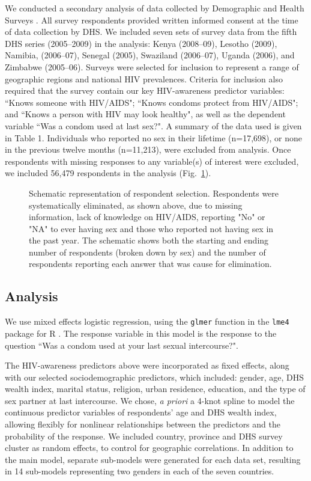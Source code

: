 \documentclass[10pt,letterpaper]{article}
\newcommand{\fref}[1]{Fig.~\ref{#1.fig}}
\newcommand{\KnowsPWHA}{``Knows someone with HIV/AIDS"}
\newcommand{\KnowsCP}{``Knows condoms protect from HIV/AIDS"}
\newcommand{\KnowsHealthy}{``Knows a person with HIV may look healthy"}
\begin{document}
We conducted a secondary analysis of data collected by Demographic and Health Surveys \cite{DHS}. All survey respondents provided written informed consent at the time of data collection by DHS.
We included seven sets of survey data from the fifth DHS series (2005--2009) in the analysis: Kenya (2008--09), Lesotho (2009), Namibia, (2006--07), Senegal (2005), Swaziland (2006--07), Uganda (2006), and Zimbabwe (2005--06). Surveys were selected for inclusion to represent a range of geographic regions and national HIV prevalences.  Criteria for inclusion also required that the survey contain  our key HIV-awareness predictor variables: \KnowsPWHA; \KnowsCP; and \KnowsHealthy, as well as the dependent variable ``Was a condom used at last sex?".  A summary of the data used is given in Table 1. Individuals who reported no sex in their lifetime (n=17,698), or none in the previous twelve months (n=11,213), were excluded from analysis. Once respondents with missing responses to any variable(s) of interest were excluded, we included 56,479 respondents in the analysis (\fref{flowchart}).


\begin{figure}[!hbt]
\caption{Schematic representation of respondent selection. Respondents were systematically eliminated, as shown above, due to missing information, lack of knowledge on HIV/AIDS,  reporting "No" or "NA" to ever having sex and those who reported not having sex in the past year. The schematic shows both the starting and ending number of respondents (broken down by sex) and the number of respondents reporting each answer that was cause for elimination.}
\label{flowchart.fig}
\end{figure}

\subsection{Analysis}

We use mixed effects logistic regression, using the {\tt glmer} function in the {\tt lme4} package for R \cite{Rstats,Rpackage_lme4}. The response variable in this model is the response to the question ``Was a condom used at your last sexual intercourse?". 

The HIV-awareness predictors above were incorporated as fixed effects, along with our selected sociodemographic predictors, which included: gender, age, DHS wealth index, marital status, religion, urban residence, education, and the type of sex partner at last intercourse. We chose, \emph{a priori} a 4-knot spline to model the continuous predictor variables of respondents' age and DHS wealth index, allowing flexibly for nonlinear relationships between the predictors and the probability of the response.  We included country, province and DHS survey cluster as random effects, to control for geographic correlations. In addition to the main model, separate sub-models were generated for each data set, resulting in 14 sub-models representing two genders in each of the seven countries.
\end{document}
